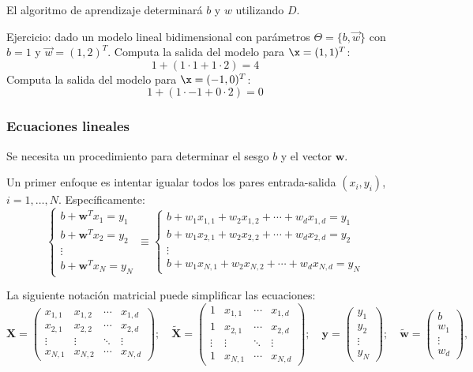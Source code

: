 El algoritmo de aprendizaje determinará $b$ y $w$ utilizando $D$.

Ejercicio: dado un modelo lineal bidimensional con parámetros $\Theta = \{ b, \vec{w}\}$ con $b = 1$ y $\vec{w} = (1,2)^T$. Computa la salida del modelo para $\x = (1,1)^T$:
$$1 + (1 \cdot 1 + 1 \cdot 2) = 4$$
 Computa la salida del modelo para $\x = (-1,0)^T$:
 $$1 + (1 \cdot -1 + 0 \cdot 2) = 0$$

\subsubsection{Ecuaciones lineales}
Se necesita un procedimiento para determinar el sesgo $b $ y el vector $\mathbf{w}$.

Un primer enfoque es intentar igualar todos los pares entrada-salida $(x_i, y_i)$, $i = 1, \ldots, N$. Específicamente:
$$
\begin{cases}
b + \mathbf{w}^T x_1 = y_1 \\
b + \mathbf{w}^T x_2 = y_2 \\
\vdots \\
b + \mathbf{w}^T x_N = y_N
\end{cases}
\equiv 
\begin{cases}
b + w_1 x_{1,1} + w_2 x_{1,2} + \cdots + w_d x_{1,d} = y_1 \\
b + w_1 x_{2,1} + w_2 x_{2,2} + \cdots + w_d x_{2,d} = y_2 \\
\vdots \\
b + w_1 x_{N,1} + w_2 x_{N,2} + \cdots + w_d x_{N,d} = y_N
\end{cases}
$$

La siguiente notación matricial puede simplificar las ecuaciones:
$$
\mathbf{X} =
\begin{pmatrix}
x_{1,1} & x_{1,2} & \cdots & x_{1,d} \\
x_{2,1} & x_{2,2} & \cdots & x_{2,d} \\
\vdots & \vdots & \ddots & \vdots \\
x_{N,1} & x_{N,2} & \cdots & x_{N,d}
\end{pmatrix}
;\quad \tilde{\mathbf{X}} =
\begin{pmatrix}
1 & x_{1,1} & \cdots & x_{1,d} \\
1 & x_{2,1} & \cdots & x_{2,d} \\
\vdots & \vdots & \ddots & \vdots \\
1 & x_{N,1} & \cdots & x_{N,d}
\end{pmatrix}
;\quad \mathbf{y} =
\begin{pmatrix}
y_1 \\
y_2 \\
\vdots \\
y_N
\end{pmatrix}
;\quad \tilde{\mathbf{w}} =
\begin{pmatrix}
b \\
w_1 \\
\vdots \\
w_d
\end{pmatrix},
$$

